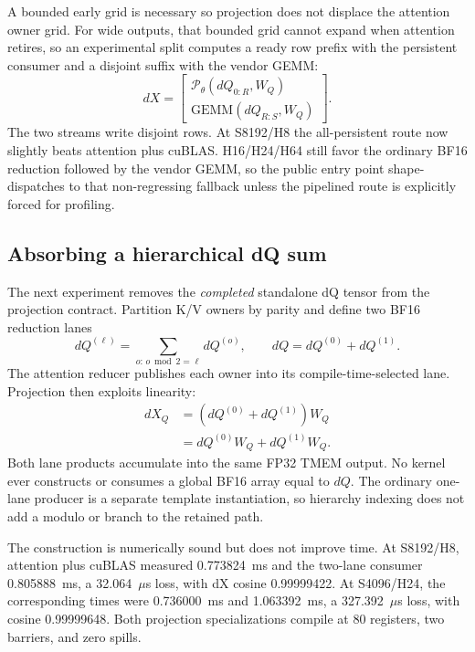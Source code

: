 A bounded early grid is necessary so projection does not displace the
attention owner grid.  For wide outputs, that bounded grid cannot expand when
attention retires, so an experimental split computes a ready row prefix with
the persistent consumer and a disjoint suffix with the vendor GEMM:
\begin{equation}
  dX=\begin{bmatrix}
    \mathcal P_{\theta}(dQ_{0:R},W_Q)\\
    \mathrm{GEMM}(dQ_{R:S},W_Q)
  \end{bmatrix}.
  \label{eq:dq-projection-tail-split}
\end{equation}
The two streams write disjoint rows.  At S8192/H8 the all-persistent route now
slightly beats attention plus cuBLAS.  H16/H24/H64 still favor the ordinary
BF16 reduction followed by the vendor GEMM, so the public entry point
shape-dispatches to that non-regressing fallback unless the pipelined route is
explicitly forced for profiling.

\subsection{Absorbing a hierarchical dQ sum}

The next experiment removes the \emph{completed} standalone dQ tensor from
the projection contract.  Partition K/V owners by parity and define two BF16
reduction lanes
\begin{equation}
  dQ^{(\ell)}=\sum_{o:\,o\bmod2=\ell}dQ^{(o)},\qquad
  dQ=dQ^{(0)}+dQ^{(1)}.
  \label{eq:dq-two-lane-hierarchy}
\end{equation}
The attention reducer publishes each owner into its compile-time-selected
lane.  Projection then exploits linearity:
\begin{align}
  dX_Q
    &=\left(dQ^{(0)}+dQ^{(1)}\right)W_Q\\
    &=dQ^{(0)}W_Q+dQ^{(1)}W_Q.
  \label{eq:dq-hierarchy-projection}
\end{align}
Both lane products accumulate into the same FP32 TMEM output.  No kernel ever
constructs or consumes a global BF16 array equal to $dQ$.  The ordinary
one-lane producer is a separate template instantiation, so hierarchy indexing
does not add a modulo or branch to the retained path.

The construction is numerically sound but does not improve time.  At
S8192/H8, attention plus cuBLAS measured 0.773824~ms and the two-lane consumer
0.805888~ms, a 32.064~$\mu$s loss, with dX cosine 0.99999422.  At S4096/H24,
the corresponding times were 0.736000~ms and 1.063392~ms, a
327.392~$\mu$s loss, with cosine 0.99999648.  Both projection specializations
compile at 80 registers, two barriers, and zero spills.

